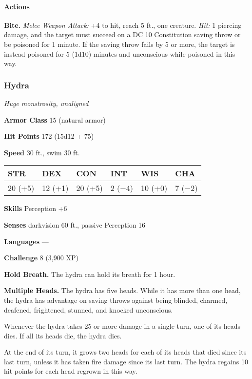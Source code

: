 \documentclass[
]{article}
\begin{document}
\hypertarget{actions-8}{%
\paragraph{Actions}\label{actions-8}}

\textbf{Bite.} \emph{Melee Weapon Attack:} +4 to hit, reach 5 ft., one
creature. \emph{Hit:} 1 piercing damage, and the target must succeed on
a DC 10 Constitution saving throw or be poisoned for 1 minute. If the
saving throw fails by 5 or more, the target is instead poisoned for 5
(1d10) minutes and unconscious while poisoned in this way.

\hypertarget{hydra}{%
\subsubsection{Hydra}\label{hydra}}

\emph{Huge monstrosity, unaligned}

\textbf{Armor Class} 15 (natural armor)

\textbf{Hit Points} 172 (15d12 + 75)

\textbf{Speed} 30 ft., swim 30 ft.

\begin{longtable}[]{@{}llllll@{}}
\toprule
STR & DEX & CON & INT & WIS & CHA\tabularnewline
\midrule
\endhead
20 (+5) & 12 (+1) & 20 (+5) & 2 (−4) & 10 (+0) & 7 (−2)\tabularnewline
\bottomrule
\end{longtable}

\textbf{Skills} Perception +6

\textbf{Senses} darkvision 60 ft., passive Perception 16

\textbf{Languages} ---

\textbf{Challenge} 8 (3,900 XP)

\textbf{Hold Breath.} The hydra can hold its breath for 1 hour.

\textbf{Multiple Heads.} The hydra has five heads. While it has more
than one head, the hydra has advantage on saving throws against being
blinded, charmed, deafened, frightened, stunned, and knocked
unconscious.

Whenever the hydra takes 25 or more damage in a single turn, one of its
heads dies. If all its heads die, the hydra dies.

At the end of its turn, it grows two heads for each of its heads that
died since its last turn, unless it has taken fire damage since its last
turn. The hydra regains 10 hit points for each head regrown in this way.
\end{document}
